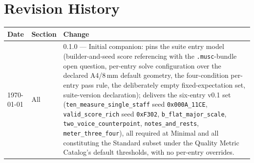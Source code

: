 \documentclass[11pt,letterpaper]{report}
\begin{document}
\chapter{Revision History}
\label{ch:history}

\begin{longtable}{p{2cm} p{2.5cm} p{9cm}}
  \toprule
  \textbf{Date} & \textbf{Section} & \textbf{Change} \\
  \midrule
  \endhead
  \today & All & 0.1.0 --- Initial companion: pins the suite entry model
  (builder-and-seed score referencing with the \texttt{.musc}-bundle open
  question, per-entry solve configuration over the declared A4/8\,mm
  default geometry, the four-condition per-entry pass rule, the
  deliberately empty fixed-expectation set, suite-version declaration);
  delivers the six-entry v0.1 set
  (\texttt{ten\_measure\_single\_staff} seed \texttt{0x000A\_11CE},
  \texttt{valid\_score\_rich} seed \texttt{0xF302},
  \texttt{b\_flat\_major\_scale}, \texttt{two\_voice\_counterpoint},
  \texttt{notes\_and\_rests}, \texttt{meter\_three\_four}), all required
  at Minimal and all constituting the Standard subset under the Quality
  Metric Catalog's default thresholds, with no per-entry overrides. \\
\bottomrule
\end{longtable}
\end{document}
